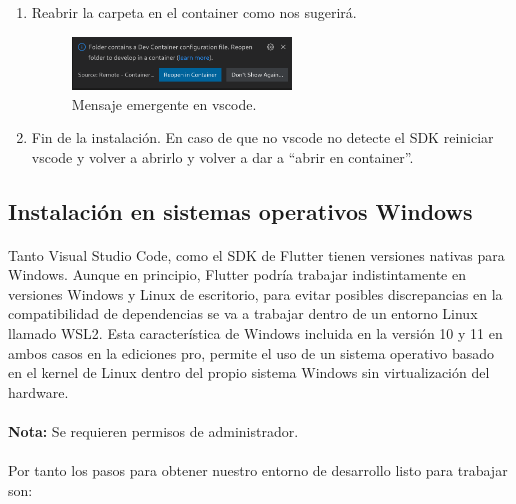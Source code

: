 \begin{enumerate}
    \item Reabrir la carpeta en el container como nos sugerirá.
    \begin{figure}[H]
        \centering
        \includegraphics[width=0.55\textwidth]{imgs/dev-container}
        \caption[Mensaje emergente en vscode]{Mensaje emergente en vscode.}
        \label{imgs:vscode-devcontainer}
    \end{figure}

    \item Fin de la instalación. En caso de que no \gls{vscode} no detecte el \gls{SDK}
    reiniciar \gls{vscode} y volver a abrirlo y volver a dar a ``abrir en container''.
\end{enumerate}

\subsection{Instalación en sistemas operativos Windows}

\paragraph{}Tanto Visual Studio Code, como el \gls{SDK} de Flutter tienen versiones
nativas para Windows. Aunque en principio, Flutter podría trabajar indistintamente en
versiones Windows y Linux de escritorio, para evitar posibles discrepancias en la
compatibilidad de dependencias se va a trabajar dentro de un entorno Linux llamado
\gls{WSL2}. Esta característica de Windows incluida en la versión 10 y 11 en ambos
casos en la ediciones pro, permite el uso de un sistema operativo basado en el kernel
de Linux dentro del propio sistema Windows sin virtualización del hardware.

\paragraph{}\textbf{Nota:} Se requieren permisos de administrador.

\paragraph{}Por tanto los pasos para obtener nuestro entorno de desarrollo listo para
trabajar son:

